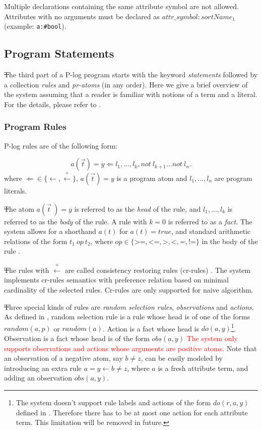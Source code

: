 \documentclass[12pt, letterpaper]{article}
\begin{document}
Multiple declarations containing the same attribute symbol are not allowed.
Attributes with no arguments must be declared as $attr\_symbol:sortName_1$ (example: \texttt{a:\#bool}).


\subsection{Program Statements}

\st The third part of a P-log program starts with the keyword \textit{statements} followed by a collection \textit{rules} and \textit{pr-atoms} (in any order). Here we give a brief overview of the system assuming that a reader is familiar with notions of a term and a literal. For the details, please refer to \cite{Balai2019}. 

\subsubsection{Program Rules}
P-log rules are of the following form:

\begin{equation}
   a(\vec{t}) = y \Leftarrow l_1,  \ldots, l_k, not~l_{k+1} \ldots not~l_{n}.
 \end{equation}
where $\Leftarrow \in \{\leftarrow, \stackrel{+}{\leftarrow}\}$,
$a(\vec{t}) = y$ is a program atom and $l_1,\ldots,l_n$ are program literals.

\st
The atom $a(\vec{t}~) = y$ is referred to as the \textit{head} of the rule, and $l_1,\ldots,l_k$ is referred to as the \textit{body} of the rule.
 A rule with $k=0$ is referred to as a \textit{fact}.
 The system allows for a shorthand $a(t)$ for $a(t) = true$, and standard arithmetic relations of the form $t_1~op~t_2$, where $op \in \{\texttt{>=},\texttt{<=},\texttt{>},\texttt{<},\texttt{=},\texttt{!=}\}$ in the body of the rule .

 \st
The rules with $\stackrel{+}{\leftarrow}$ are called consistency restoring rules (cr-rules) \cite{crrule}. The system implements cr-rules semantics with preference relation based on minimal cardinality of the selected rules. Cr-rules are only supported for naive algorithm.

\st
 Three special kinds of rules are \textit{random selection rules}, \textit{observations} and \textit{actions}.
 As defined in \cite{Balai2019},
 random selection rule is a rule whose head is of one of the forms $random(a,p)$ or $random(a)$. Action is a fact whose head is $do(a,y)$\footnote{The system doesn't support rule labels and actions of the form $do(r,a,y)$ defined in \cite{Balai2019}. Therefore there has to be at most one action for each attribute term. This limitation will be removed in future.}.
 Observation is a fact whose head is of the form $obs(a,y)$ \textcolor{red}{The system only supports observations and actions whose arguments are positive atoms.} Note that an observation of a negative atom, say $b \not= z$, can be easily modeled by introducing an extra rule $a = y \leftarrow b \not=z$, where $a$ is a fresh attribute term, and adding an observation $obs(a,y)$. 
 
\end{document}
